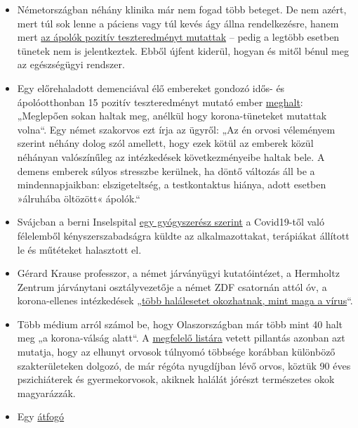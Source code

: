 \begin{itemize}
\tightlist
\item
  Németországban néhány klinika már nem fogad több beteget. De nem
  azért, mert túl sok lenne a páciens vagy túl kevés ágy állna
  rendelkezésre, hanem mert
  \href{https://www.sueddeutsche.de/panorama/coronavirus-news-deutschland-wolfsburg-laschet-1.4828033}{az
  ápolók pozitív teszteredményt mutattak} -- pedig a legtöbb esetben
  tünetek nem is jelentkeztek. Ebből újfent kiderül, hogyan és mitől
  bénul meg az egészségügyi rendszer.
\item
  Egy előrehaladott demenciával élő embereket gondozó idős- és
  ápolóotthonban 15 pozitív teszteredményt mutató ember
  \href{https://www.sueddeutsche.de/panorama/coronavirus-news-deutschland-wolfsburg-laschet-1.4828033}{meghalt}:
  „Meglepően sokan haltak meg, anélkül hogy korona-tüneteket mutattak
  volna``. Egy német szakorvos ezt írja az ügyről: „Az én orvosi
  véleményem szerint néhány dolog szól amellett, hogy ezek kötül az
  emberek közül néhányan valószínűleg az intézkedések következményeibe
  haltak bele. A demens emberek súlyos stresszbe kerülnek, ha döntő
  változás áll be a mindennapjaikban: elszigeteltség, a testkontaktus
  hiánya, adott esetben »álruhába öltözött« ápolók.``
\item
  Svájcban a berni Inselspital
  \href{https://twitter.com/sneatio/status/1244157986832101376}{egy
  gyógyszerész szerint} a Covid19-től való félelemből
  kényszerszabadságra küldte az alkalmazottakat, terápiákat állított le
  és műtéteket halasztott el.
\item
  Gérard Krause professzor, a német járványügyi kutatóintézet, a
  Hermholtz Zentrum járványtani osztályvezetője a német ZDF csatornán
  attól óv, a korona-ellenes intézkedések
  „\href{https://www.zdf.de/nachrichten/politik/coronavirus-epidemiologe-folgen-helmholtz-100.html}{több
  halálesetet okozhatnak, mint maga a vírus}``.
\item
  Több médium arról számol be, hogy Olaszországban már több mint 40 halt
  meg „a korona-válság alatt``. A
  \href{https://portale.fnomceo.it/elenco-dei-medici-caduti-nel-corso-dellepidemia-di-covid-19/?ref=drnweb.repubblica.scroll-1}{megfelelő
  listára} vetett pillantás azonban azt mutatja, hogy az elhunyt orvosok
  túlnyomó többsége korábban különböző szakterületeken dolgozó, de már
  régóta nyugdíjban lévő orvos, köztük 90 éves pszichiáterek és
  gyermekorvosok, akiknek halálát jórészt természetes okok magyarázzák.
\item
  Egy
  \href{https://www.government.is/news/article/?newsid=c65cf658-6eb6-11ea-9462-005056bc4d74}{átfogó
}
\end{itemize}
